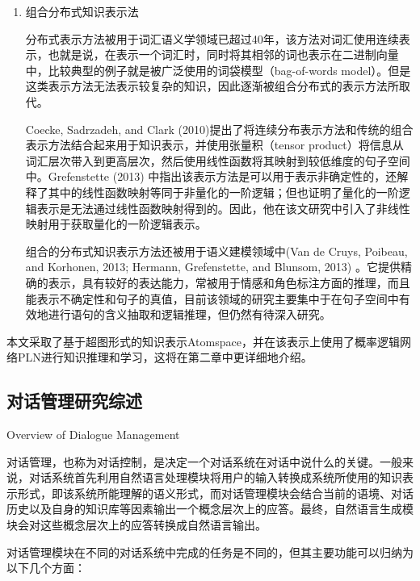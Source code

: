 \begin{enumerate}
\begin{enumerate}
\end{enumerate}

\item  {组合分布式知识表示法}

 分布式表示方法被用于词汇语义学领域已超过40年\cite{Jurafsky2008}，该方法对词汇使用连续表示，也就是说，在表示一个词汇时，同时将其相邻的词也表示在二进制向量中，比较典型的例子就是被广泛使用的词袋模型（bag-of-words model）。但是这类表示方法无法表示较复杂的知识，因此逐渐被组合分布式的表示方法所取代。

      Coecke, Sadrzadeh, and Clark (2010)提出了将连续分布表示方法和传统的组合表示方法结合起来用于知识表示，并使用张量积（tensor product）将信息从词汇层次带入到更高层次，然后使用线性函数将其映射到较低维度的句子空间中。Grefenstette (2013) 中指出该表示方法是可以用于表示非确定性的，还解释了其中的线性函数映射等同于非量化的一阶逻辑；但也证明了量化的一阶逻辑表示是无法通过线性函数映射得到的。因此，他在该文研究中引入了非线性映射用于获取量化的一阶逻辑表示。


组合的分布式知识表示方法还被用于语义建模领域中(Van de Cruys, Poibeau, and Korhonen, 2013; Hermann, Grefenstette, and Blunsom, 2013) 。它提供精确的表示，具有较好的表达能力，常被用于情感和角色标注方面的推理，而且能表示不确定性和句子的真值，目前该领域的研究主要集中于在句子空间中有效地进行语句的含义抽取和逻辑推理，但仍然有待深入研究。



\end{enumerate}


   本文采取了基于超图形式的知识表示Atomspace，并在该表示上使用了概率逻辑网络PLN进行知识推理和学习，这将在第二章中更详细地介绍。


\subsection{对话管理研究综述}{Overview of Dialogue Management}

对话管理，也称为对话控制，是决定一个对话系统在对话中说什么的关键。一般来说，对话系统首先利用自然语言处理模块将用户的输入转换成系统所使用的知识表示形式，即该系统所能理解的语义形式，而对话管理模块会结合当前的语境、对话历史以及自身的知识库等因素输出一个概念层次上的应答。最终，自然语言生成模块会对这些概念层次上的应答转换成自然语言输出。

对话管理模块在不同的对话系统中完成的任务是不同的，但其主要功能可以归纳为以下几个方面：

